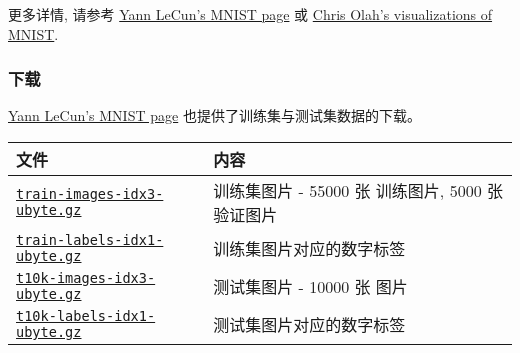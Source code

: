 更多详情, 请参考 \href{http://yann.lecun.com/exdb/mnist/}{Yann LeCun's
MNIST page} 或
\href{http://colah.github.io/posts/2014-10-Visualizing-MNIST/}{Chris
Olah's visualizations of MNIST}.

\subsubsection{下载 }\label{ux4e0bux8f7d}

\href{http://yann.lecun.com/exdb/mnist/}{Yann LeCun's MNIST page}
也提供了训练集与测试集数据的下载。

\begin{longtable}[c]{@{}ll@{}}
\toprule
\begin{minipage}[b]{0.05\columnwidth}\raggedright\strut
文件
\strut\end{minipage} &
\begin{minipage}[b]{0.05\columnwidth}\raggedright\strut
内容
\strut\end{minipage}\tabularnewline
\midrule
\endhead
\begin{minipage}[t]{0.05\columnwidth}\raggedright\strut
\href{http://yann.lecun.com/exdb/mnist/train-images-idx3-ubyte.gz}{\texttt{train-images-idx3-ubyte.gz}}
\strut\end{minipage} &
\begin{minipage}[t]{0.05\columnwidth}\raggedright\strut
训练集图片 - 55000 张 训练图片, 5000 张 验证图片
\strut\end{minipage}\tabularnewline
\begin{minipage}[t]{0.05\columnwidth}\raggedright\strut
\href{http://yann.lecun.com/exdb/mnist/train-labels-idx1-ubyte.gz}{\texttt{train-labels-idx1-ubyte.gz}}
\strut\end{minipage} &
\begin{minipage}[t]{0.05\columnwidth}\raggedright\strut
训练集图片对应的数字标签
\strut\end{minipage}\tabularnewline
\begin{minipage}[t]{0.05\columnwidth}\raggedright\strut
\href{http://yann.lecun.com/exdb/mnist/t10k-images-idx3-ubyte.gz}{\texttt{t10k-images-idx3-ubyte.gz}}
\strut\end{minipage} &
\begin{minipage}[t]{0.05\columnwidth}\raggedright\strut
测试集图片 - 10000 张 图片
\strut\end{minipage}\tabularnewline
\begin{minipage}[t]{0.05\columnwidth}\raggedright\strut
\href{http://yann.lecun.com/exdb/mnist/t10k-labels-idx1-ubyte.gz}{\texttt{t10k-labels-idx1-ubyte.gz}}
\strut\end{minipage} &
\begin{minipage}[t]{0.05\columnwidth}\raggedright\strut
测试集图片对应的数字标签
\strut\end{minipage}\tabularnewline
\bottomrule
\end{longtable}


